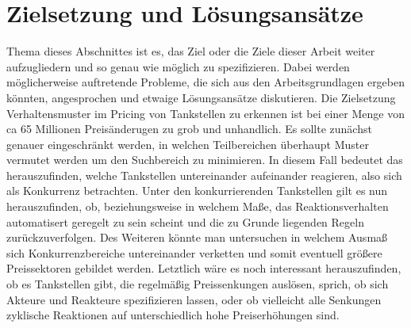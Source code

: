 \documentclass[12pt,a4paper,bibliography=totocnumbered,listof=totocnumbered]{scrartcl}
\begin{document}

\vspace{-1,2em}
\newpage

\section{Zielsetzung und Lösungsansätze}
Thema dieses Abschnittes ist es, das Ziel oder die Ziele dieser Arbeit weiter aufzugliedern und so genau wie möglich zu spezifizieren. Dabei werden möglicherweise auftretende Probleme, die sich aus den Arbeitsgrundlagen ergeben könnten, angesprochen und etwaige Lösungsansätze diskutieren. Die Zielsetzung Verhaltensmuster im Pricing von Tankstellen zu erkennen ist bei einer Menge von ca 65 Millionen Preisänderugen zu grob und unhandlich. Es sollte zunächst genauer eingeschränkt werden, in welchen Teilbereichen überhaupt Muster vermutet werden um den Suchbereich zu minimieren. In diesem Fall bedeutet das herauszufinden, welche Tankstellen untereinander aufeinander reagieren, also sich als Konkurrenz betrachten. Unter den konkurrierenden Tankstellen gilt es nun herauszufinden, ob, beziehungsweise in welchem Maße, das Reaktionsverhalten automatisert geregelt zu sein scheint und die zu Grunde liegenden Regeln zurückzuverfolgen. Des Weiteren könnte man untersuchen in welchem Ausmaß sich Konkurrenzbereiche  untereinander verketten und somit eventuell größere Preissektoren gebildet werden. Letztlich wäre es noch interessant herauszufinden, ob es Tankstellen gibt, die regelmäßig Preissenkungen auslösen, sprich, ob sich Akteure und Reakteure spezifizieren lassen, oder ob vielleicht alle Senkungen zyklische Reaktionen auf unterschiedlich hohe Preiserhöhungen sind.

\end{document}
